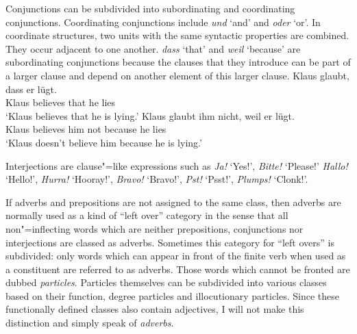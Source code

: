 {Conjunctions can be subdivided into subordinating and coordinating conjunctions. Coordinating conjunctions include
\emph{und} `and' and \emph{oder} `or'. In coordinate structures, two units with the same syntactic properties are
combined. They occur adjacent to one another. \emph{dass} `that' and \emph{weil} `because' are subordinating conjunctions because
the clauses that they introduce can be part of a larger clause and depend on another element of this
larger clause.
\eal
\ex 
\gll Klaus glaubt, dass er lügt.\\
	 Klaus believes that he lies\\
\glt `Klaus believes that he is lying.'
\ex 
\gll Klaus glaubt ihm nicht, weil er lügt.\\
	 Klaus believes him not because he lies\\
\glt `Klaus doesn't believe him because he is lying.'
\zl

Interjections are clause"=like expressions such as \emph{Ja!} `Yes!', \emph{Bitte!} `Please!' %
\emph{Hallo!} `Hel\-lo!', 
 \emph{Hurra!} `Hooray!', \emph{Bravo!} `Bravo!', \emph{Pst!} `Psst!', \emph{Plumps!} `Clonk!'.
 
If adverbs and prepositions are not assigned to the same class, then adverbs are normally used as a kind of ``left over''
category in the sense that all non"=inflecting words which are neither prepositions, conjunctions nor interjections are classed as adverbs. Sometimes
this category for ``left overs'' is subdivided: only words which can appear in front of the finite verb when used as a constituent are 
referred to as adverbs. Those words which cannot be fronted are dubbed \emph{particles}. Particles themselves can be subdivided
into various classes based on their function, \eg degree particles and illocutionary
particles. Since these functionally defined classes also contain adjectives, I will not make this distinction and simply speak of \emph{adverbs}.


}
